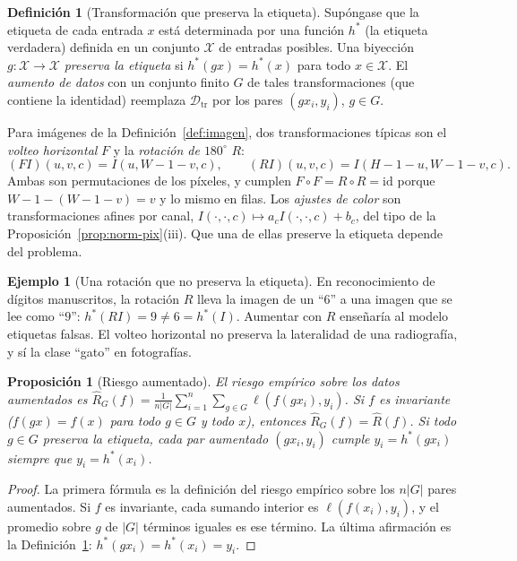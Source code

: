 \documentclass[11pt]{article}
\newtheorem{proposicion}[teorema]{Proposición}
\theoremstyle{definition}
\newtheorem{definicion}[teorema]{Definición}
\newtheorem{ejemplo}[teorema]{Ejemplo}
\theoremstyle{remark}
\newcommand{\abs}[1]{\left\lvert #1\right\rvert}
\newcommand{\Dtr}{\mathcal{D}_{\mathrm{tr}}}
\begin{document}
\begin{definicion}[Transformación que preserva la etiqueta]\label{def:preserva}
\noindent Supóngase que la etiqueta de cada entrada $x$ está determinada por una función $h^*$ (la etiqueta verdadera) definida en un conjunto $\mathcal{X}$ de entradas posibles. Una biyección $g:\mathcal X\to\mathcal X$ \emph{preserva la etiqueta} si $h^*(gx)=h^*(x)$ para todo $x\in\mathcal X$. El \emph{aumento de datos} con un conjunto finito $G$ de tales transformaciones (que contiene la identidad) reemplaza $\Dtr$ por los pares $(gx_i,y_i)$, $g\in G$.
\end{definicion}

\noindent Para imágenes de la Definición~\ref{def:imagen}, dos transformaciones típicas son el \emph{volteo horizontal} $F$ y la \emph{rotación de $180^\circ$} $R$:
\[
(FI)(u,v,c)=I(u,W-1-v,c),\qquad (RI)(u,v,c)=I(H-1-u,W-1-v,c).
\]
Ambas son permutaciones de los píxeles, y cumplen $F\circ F=R\circ R=\mathrm{id}$ porque $W-1-(W-1-v)=v$ y lo mismo en filas. Los \emph{ajustes de color} son transformaciones afines por canal, $I(\cdot,\cdot,c)\mapsto a_cI(\cdot,\cdot,c)+b_c$, del tipo de la Proposición~\ref{prop:norm-pix}(iii). Que una de ellas preserve la etiqueta depende del problema.

\begin{ejemplo}[Una rotación que no preserva la etiqueta]\label{ej:seis-nueve}
\noindent En reconocimiento de dígitos manuscritos, la rotación $R$ lleva la imagen de un ``$6$'' a una imagen que se lee como ``$9$'': $h^*(RI)=9\ne6=h^*(I)$. Aumentar con $R$ enseñaría al modelo etiquetas falsas. El volteo horizontal no preserva la lateralidad de una radiografía, y sí la clase ``gato'' en fotografías.
\end{ejemplo}

\begin{proposicion}[Riesgo aumentado]\label{prop:aumento}
\noindent El riesgo empírico sobre los datos aumentados es $\hat R_G(f)=\frac1{n\abs G}\sum_{i=1}^n\sum_{g\in G}\ell(f(gx_i),y_i)$. Si $f$ es invariante ($f(gx)=f(x)$ para todo $g\in G$ y todo $x$), entonces $\hat R_G(f)=\hat R(f)$. Si todo $g\in G$ preserva la etiqueta, cada par aumentado $(gx_i,y_i)$ cumple $y_i=h^*(gx_i)$ siempre que $y_i=h^*(x_i)$.
\end{proposicion}
\begin{proof}
\noindent La primera fórmula es la definición del riesgo empírico sobre los $n\abs G$ pares aumentados. Si $f$ es invariante, cada sumando interior es $\ell(f(x_i),y_i)$, y el promedio sobre $g$ de $\abs G$ términos iguales es ese término. La última afirmación es la Definición~\ref{def:preserva}: $h^*(gx_i)=h^*(x_i)=y_i$.
\end{proof}
\end{document}
